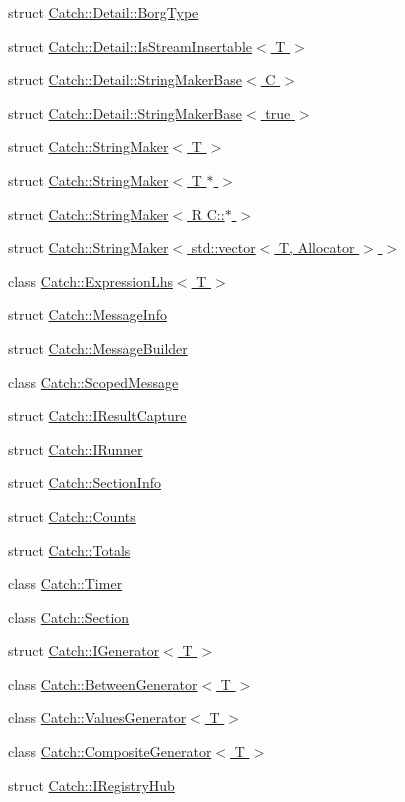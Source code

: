 \begin{DoxyCompactItemize}
\item 
struct \hyperlink{a00010}{Catch\+::\+Detail\+::\+Borg\+Type}
\item 
struct \hyperlink{a00043}{Catch\+::\+Detail\+::\+Is\+Stream\+Insertable$<$ T $>$}
\item 
struct \hyperlink{a00082}{Catch\+::\+Detail\+::\+String\+Maker\+Base$<$ C $>$}
\item 
struct \hyperlink{a00083}{Catch\+::\+Detail\+::\+String\+Maker\+Base$<$ true $>$}
\item 
struct \hyperlink{a00078}{Catch\+::\+String\+Maker$<$ T $>$}
\item 
struct \hyperlink{a00081}{Catch\+::\+String\+Maker$<$ T $\ast$ $>$}
\item 
struct \hyperlink{a00079}{Catch\+::\+String\+Maker$<$ R C\+::$\ast$ $>$}
\item 
struct \hyperlink{a00080}{Catch\+::\+String\+Maker$<$ std\+::vector$<$ T, Allocator $>$ $>$}
\item 
class \hyperlink{a00028}{Catch\+::\+Expression\+Lhs$<$ T $>$}
\item 
struct \hyperlink{a00050}{Catch\+::\+Message\+Info}
\item 
struct \hyperlink{a00049}{Catch\+::\+Message\+Builder}
\item 
class \hyperlink{a00071}{Catch\+::\+Scoped\+Message}
\item 
struct \hyperlink{a00040}{Catch\+::\+I\+Result\+Capture}
\item 
struct \hyperlink{a00041}{Catch\+::\+I\+Runner}
\item 
struct \hyperlink{a00073}{Catch\+::\+Section\+Info}
\item 
struct \hyperlink{a00015}{Catch\+::\+Counts}
\item 
struct \hyperlink{a00089}{Catch\+::\+Totals}
\item 
class \hyperlink{a00088}{Catch\+::\+Timer}
\item 
class \hyperlink{a00072}{Catch\+::\+Section}
\item 
struct \hyperlink{a00034}{Catch\+::\+I\+Generator$<$ T $>$}
\item 
class \hyperlink{a00008}{Catch\+::\+Between\+Generator$<$ T $>$}
\item 
class \hyperlink{a00091}{Catch\+::\+Values\+Generator$<$ T $>$}
\item 
class \hyperlink{a00012}{Catch\+::\+Composite\+Generator$<$ T $>$}
\item 
struct \hyperlink{a00039}{Catch\+::\+I\+Registry\+Hub}
\item 

\end{DoxyCompactItemize}
